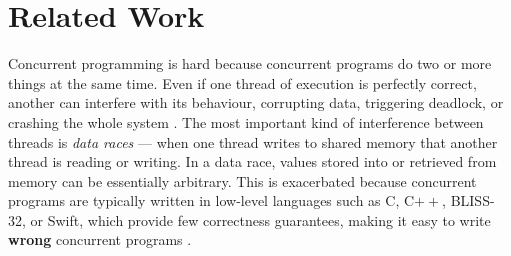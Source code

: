 \section{Related Work}
	



Concurrent programming is hard \cite{lea98,concurrentHard}
%
%
%
because concurrent programs do two or more things at the same
time. Even if one thread of execution is perfectly correct, another
can interfere with its behaviour, corrupting data, triggering
deadlock, or crashing the whole system \cite{fonesca2010}.
%
%
The most important kind of interference between threads is
\textit{data races} --- when one thread writes to shared memory that
another thread is reading or writing.
%
In a data race, values stored into or retrieved from memory can be
essentially arbitrary.
%
%
%
%
%
This is exacerbated because concurrent programs are typically written in low-level languages
such as C, C$++$, BLISS-32, or Swift, which provide
few correctness guarantees, making it easy to write \textbf{wrong}
concurrent programs
\cite{CCppSCAM2014,LuSurvey2008}.
%
%
%
%
%
%

